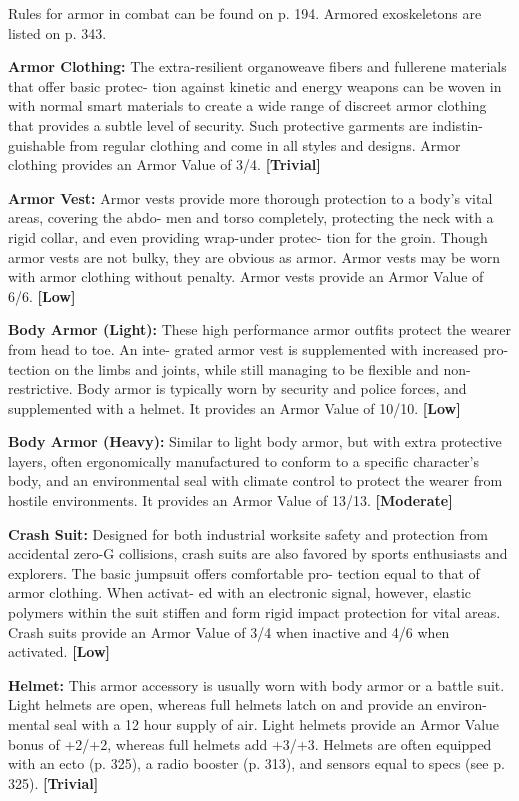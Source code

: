 Rules for armor in combat can be found on p. 194. 
Armored exoskeletons are listed on p. 343.

\textbf{Armor Clothing:} The extra-resilient organoweave 
fibers and fullerene materials that offer basic protec-
tion against kinetic and energy weapons can be woven 
in with normal smart materials to create a wide range 
of discreet armor clothing that provides a subtle level 
of security. Such protective garments are indistin-
guishable from regular clothing and come in all styles 
and designs. Armor clothing provides an Armor Value 
of 3/4. \textbf{[Trivial]}

\textbf{Armor Vest:} Armor vests provide more thorough 
protection to a body's vital areas, covering the abdo-
men and torso completely, protecting the neck with a 
rigid collar, and even providing wrap-under protec-
tion for the groin. Though armor vests are not bulky, 
they are obvious as armor. Armor vests may be worn 
with armor clothing without penalty. Armor vests 
provide an Armor Value of 6/6. \textbf{[Low]}

\textbf{Body Armor (Light):} These high performance armor 
outfits protect the wearer from head to toe. An inte-
grated armor vest is supplemented with increased pro-
tection on the limbs and joints, while still managing to 
be flexible and non-restrictive. Body armor is typically 
worn by security and police forces, and supplemented 
with a helmet. It provides an Armor Value of 10/10. 
\textbf{[Low]}

\textbf{Body Armor (Heavy):} Similar to light body armor, 
but with extra protective layers, often ergonomically 
manufactured to conform to a specific  character's 
body, and an environmental seal with climate control 
to protect the wearer from hostile environments. It 
provides an Armor Value of 13/13. \textbf{[Moderate]}

\textbf{Crash Suit:} Designed for both industrial worksite 
safety and protection from accidental zero-G collisions, 
crash suits are also favored by sports enthusiasts and 
explorers. The basic jumpsuit offers comfortable pro-
tection equal to that of armor clothing. When activat-
ed with an electronic signal, however, elastic polymers 
within the suit stiffen and form rigid impact protection 
for vital areas. Crash suits provide an Armor Value of 
3/4 when inactive and 4/6 when activated. \textbf{[Low]}

\textbf{Helmet:} This armor accessory is usually worn with 
body armor or a battle suit. Light helmets are open, 
whereas full helmets latch on and provide an environ-
mental seal with a 12 hour supply of air. Light helmets 
provide an Armor Value bonus of +2/+2, whereas full 
helmets add +3/+3. Helmets are often equipped with 
an ecto (p. 325), a radio booster (p. 313), and sensors 
equal to specs (see p. 325). \textbf{[Trivial]}

